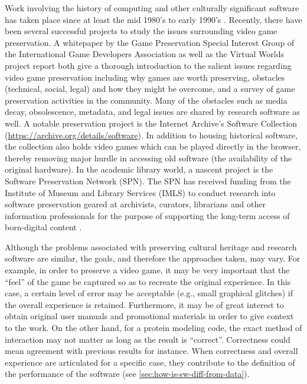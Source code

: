 \documentclass[letterpaper,11pt]{article}
\begin{document}
Work involving the history of computing and other culturally significant software has taken place since at least the mid 1980's to early 1990's \citep{lowood2013}. Recently, there have been several successful projects to study the issues surrounding video game preservation. A whitepaper by the Game Preservation Special Interest Group of the International Game Developers Association \citep{monnens2009} as well as the Virtual Worlds project report \citep{mcdonough2010} both give a thorough introduction to the salient issues regarding video game preservation including why games are worth preserving, obstacles (technical, social, legal) and how they might be overcome, and a survey of game preservation activities in the community. Many of the obstacles such as media decay, obsolescence, metadata, and legal issues are shared by research software as well. A notable preservation project is the Internet Archive's Software Collection (\url{https://archive.org/details/software}). In addition to housing historical software, the collection also holds video games which can be played directly in the browser, thereby removing major hurdle in accessing old software (the availability of the original hardware). In the academic library world, a nascent project is the Software Preservation Network (SPN). The SPN has received funding from the Institute of Museum and Library Services (IMLS) to conduct research into software preservation geared at archivists, curators, librarians and other information professionals for the purpose of supporting the long-term access of born-digital content \citep{vowell2015}.

Although the problems associated with preserving cultural heritage and research software are similar, the goals, and therefore the approaches taken, may vary. For example, in order to preserve a video game, it may be very important that the ``feel'' of the game be captured so as to recreate the original experience. In this case, a certain level of error may be acceptable (e.g., small graphical glitches) if the overall experience is retained. Furthermore, it may be of great interest to obtain original user manuals and promotional materials in order to give context to the work. On the other hand, for a protein modeling code, the exact method of interaction may not matter as long as the result is ``correct''. Correctness could mean agreement with previous results for instance.  When correctness and overall experience are articulated for a specific case, they contribute to the definition of the performance of the software (see \cref{sec:how-is-sw-diff-from-data}).
\end{document}
